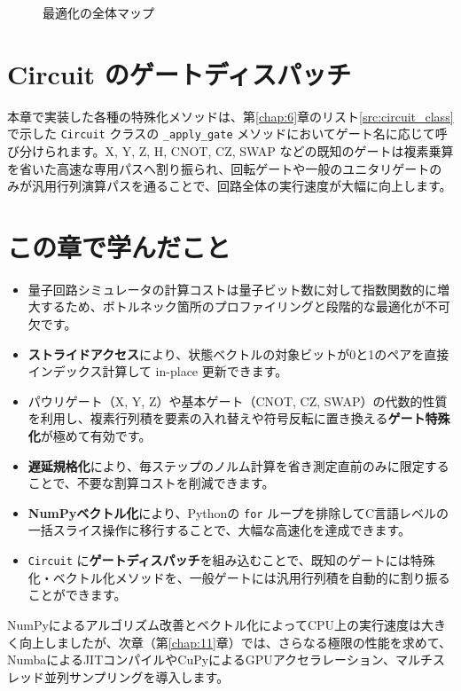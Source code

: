 \begin{figure}[htbp]
\caption{最適化の全体マップ}
\label{fig:optimization_map}
\end{figure}

\section{Circuit のゲートディスパッチ}

本章で実装した各種の特殊化メソッドは、第\ref{chap:6}章のリスト\ref{src:circuit_class}で示した \texttt{Circuit} クラスの \texttt{\_apply\_gate} メソッドにおいてゲート名に応じて呼び分けられます。X, Y, Z, H, CNOT, CZ, SWAP などの既知のゲートは複素乗算を省いた高速な専用パスへ割り振られ、回転ゲートや一般のユニタリゲートのみが汎用行列演算パスを通ることで、回路全体の実行速度が大幅に向上します。

\section{この章で学んだこと}

\begin{itemize}
\item 量子回路シミュレータの計算コストは量子ビット数に対して指数関数的に増大するため、ボトルネック箇所のプロファイリングと段階的な最適化が不可欠です。
\item \textbf{ストライドアクセス}により、状態ベクトルの対象ビットが0と1のペアを直接インデックス計算して in-place 更新できます。
\item パウリゲート（X, Y, Z）や基本ゲート（CNOT, CZ, SWAP）の代数的性質を利用し、複素行列積を要素の入れ替えや符号反転に置き換える\textbf{ゲート特殊化}が極めて有効です。
\item \textbf{遅延規格化}により、毎ステップのノルム計算を省き測定直前のみに限定することで、不要な割算コストを削減できます。
\item \textbf{NumPyベクトル化}により、Pythonの \texttt{for} ループを排除してC言語レベルの一括スライス操作に移行することで、大幅な高速化を達成できます。
\item \texttt{Circuit} に\textbf{ゲートディスパッチ}を組み込むことで、既知のゲートには特殊化・ベクトル化メソッドを、一般ゲートには汎用行列積を自動的に割り振ることができます。
\end{itemize}

NumPyによるアルゴリズム改善とベクトル化によってCPU上の実行速度は大きく向上しましたが、次章（第\ref{chap:11}章）では、さらなる極限の性能を求めて、NumbaによるJITコンパイルやCuPyによるGPUアクセラレーション、マルチスレッド並列サンプリングを導入します。
